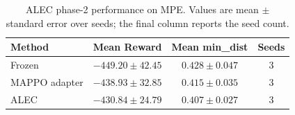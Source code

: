 \begin{table}[t]
\centering
\caption{ALEC phase-2 performance on MPE. Values are mean $\pm$ standard error over seeds; the final column reports the seed count.}
\label{tab:alec_phase2_mpe}
\begin{tabular}{lccc}
\toprule
Method & Mean Reward & Mean min\_dist & Seeds \\
\midrule
Frozen & $-449.20 \pm 42.45$ & $0.428 \pm 0.047$ & 3 \\
MAPPO adapter & $-438.93 \pm 32.85$ & $0.415 \pm 0.035$ & 3 \\
ALEC & $-430.84 \pm 24.79$ & $0.407 \pm 0.027$ & 3 \\
\bottomrule
\end{tabular}
\end{table}
